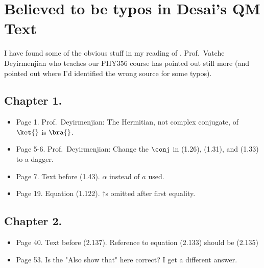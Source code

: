 

\label{chap:desaiTypos}
{}
\date{Oct 31, 2010}

\chapter{Believed to be typos in Desai's QM Text}

\beginArtNoToc

I have found some of the obvious stuff in my reading of \citep{desai2009quantum}.  Prof.\ Vatche Deyirmenjian who teaches our PHY356 course has pointed out still more (and pointed out where I'd identified the wrong source for some typos).

\section{Chapter 1.}

\begin{itemize}
\item Page 1.  Prof.\ Deyirmenjian: The Hermitian, not complex conjugate, of $\ket{}$ is $\bra{}$.
\item Page 5-6.  Prof.\ Deyirmenjian: Change the $\conj$ in (1.26), (1.31), and (1.33) to a dagger.
\item Page 7.  Text before (1.43).  $\alpha$ instead of $a$ used.
\item Page 19.  Equation (1.122).  $\dagger$s omitted after first equality.
\end{itemize}

\section{Chapter 2.}
\begin{itemize}
\item Page 40.  Text before (2.137).  Reference to equation (2.133) should be (2.135)
\item Page 53.  Is the "Also show that" here correct?  I get a different answer.
\end{itemize}

